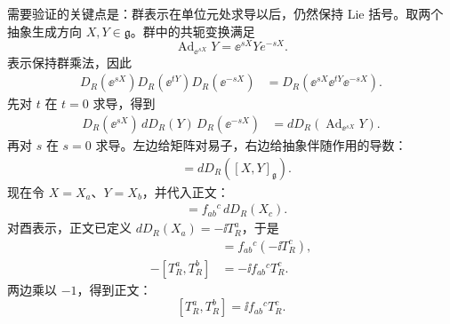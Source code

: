 \begin{derivation}
需要验证的关键点是：群表示在单位元处求导以后，仍然保持 Lie 括号。取两个抽象生成方向 $X,Y\in\mathfrak g$。群中的共轭变换满足
\[
\operatorname{Ad}_{\ee^{sX}}Y=\ee^{sX}Ye^{-sX}.
\]
表示保持群乘法，因此
\begin{align*}
D_R(\ee^{sX})D_R(\ee^{tY})D_R(\ee^{-sX})
&=D_R\!\left(\ee^{sX}\ee^{tY}\ee^{-sX}\right).
\end{align*}
先对 $t$ 在 $t=0$ 求导，得到
\begin{align*}
D_R(\ee^{sX})\,dD_R(Y)\,D_R(\ee^{-sX})
&=dD_R\!\left(\operatorname{Ad}_{\ee^{sX}}Y\right).
\end{align*}
再对 $s$ 在 $s=0$ 求导。左边给矩阵对易子，右边给抽象伴随作用的导数：
\begin{align*}
[dD_R(X),dD_R(Y)]
&=dD_R([X,Y]_{\mathfrak g}).
\end{align*}
现在令 $X=X_a$、$Y=X_b$，并代入正文：
\begin{align*}
[dD_R(X_a),dD_R(X_b)]
&=f_{ab}{}^c\,dD_R(X_c).
\end{align*}
对酉表示，正文已定义 $dD_R(X_a)=-\ii T_R^a$，于是
\begin{align*}
[-\ii T_R^a,-\ii T_R^b]
&=f_{ab}{}^c(-\ii T_R^c),\\
-[T_R^a,T_R^b]
&=-\ii f_{ab}{}^cT_R^c.
\end{align*}
两边乘以 $-1$，得到正文：
\[
[T_R^a,T_R^b]=\ii f_{ab}{}^cT_R^c.
\]
\end{derivation}











